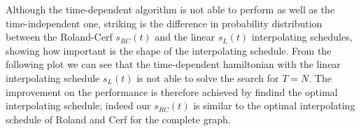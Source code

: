     \noindent
    Although the time-dependent algorithm is not able to perform as well as the time-independent one, striking is the difference in probability distribution between the Roland-Cerf $s_{RC}(t)$ and the linear $s_L(t)$ interpolating schedules, showing how important is the shape of the interpolating schedule. From the following plot we can see that the time-dependent hamiltonian with the linear interpolating schedule $s_L(t)$ is not able to solve the search for $T=N$. The improvement on the performance is therefore achieved by findind the optimal interpolating schedule; indeed our $s_{RC}(t)$ is similar to the optimal interpolating schedule of Roland and Cerf for the complete graph.

    
